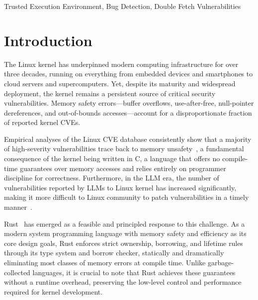 \documentclass[conference]{IEEEtran}
\begin{document}
\begin{IEEEkeywords}
Trusted Execution Environment, Bug Detection, Double Fetch Vulnerabilities
\end{IEEEkeywords}

\section{Introduction}



The Linux kernel has underpinned modern computing infrastructure for over three decades, running on everything from embedded devices and smartphones
to cloud servers and supercomputers. Yet, despite its maturity and widespread deployment, the kernel remains a persistent source of critical security
vulnerabilities. Memory safety errors---buffer overflows, use-after-free, null-pointer dereferences, and out-of-bounds accesses---account for a disproportionate fraction of reported kernel CVEs. 

Empirical analyses of the Linux CVE database consistently show that a majority of high-severity vulnerabilities trace back to memory unsafety~\cite{TODO:cve_study,TODO:linux_memory_bugs}, a fundamental consequence of the kernel being written in C, a language that offers no compile-time guarantees over memory accesses and relies entirely on programmer discipline for correctness. Furthermore, in the LLM era, the number of vulnerabilities reported by LLMs to Linux kernel has increased significantly, making it more difficult to Linux community to patch vulnerabilities in a timely manner~\cite{TODO:llm_vulnerabilities_to_linux}.

Rust~\cite{TODO:rust_book} has emerged as a feasible and principled response to this challenge. As a modern system programming language with memory safety and efficiency as its core design goals, Rust enforces strict ownership, borrowing, and lifetime rules through its type system and borrow checker, statically and dramatically eliminating most classes of memory errors at compile time. Unlike garbage-collected languages, it is crucial to note that Rust achieves these guarantees without a runtime overhead, preserving the low-level control and performance required for kernel development.
\end{document}

